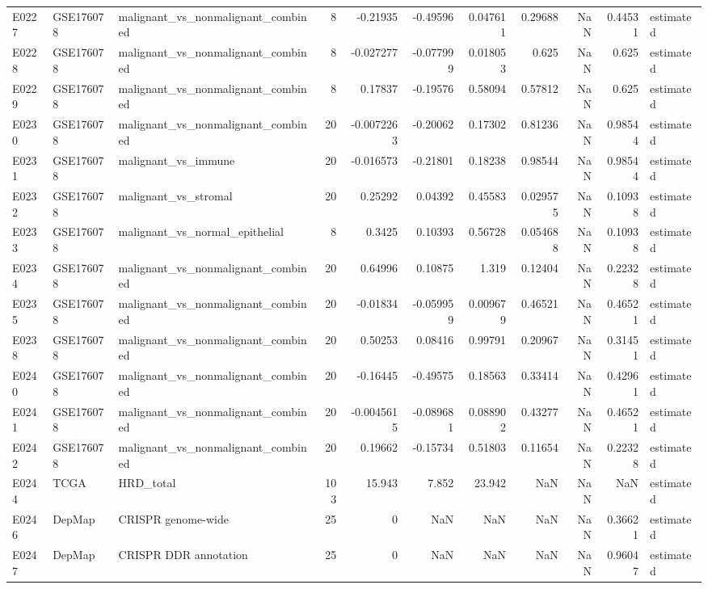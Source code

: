 \begin{longtable}{lllrrrrrrrl}
E0227 & GSE176078 & malignant\_vs\_nonmalignant\_combined & 8 & -0.21935 & -0.49596 & 0.047611 & 0.29688 & NaN & 0.44531 & estimated \\
E0228 & GSE176078 & malignant\_vs\_nonmalignant\_combined & 8 & -0.027277 & -0.077999 & 0.018053 & 0.625 & NaN & 0.625 & estimated \\
E0229 & GSE176078 & malignant\_vs\_nonmalignant\_combined & 8 & 0.17837 & -0.19576 & 0.58094 & 0.57812 & NaN & 0.625 & estimated \\
E0230 & GSE176078 & malignant\_vs\_nonmalignant\_combined & 20 & -0.0072263 & -0.20062 & 0.17302 & 0.81236 & NaN & 0.98544 & estimated \\
E0231 & GSE176078 & malignant\_vs\_immune & 20 & -0.016573 & -0.21801 & 0.18238 & 0.98544 & NaN & 0.98544 & estimated \\
E0232 & GSE176078 & malignant\_vs\_stromal & 20 & 0.25292 & 0.04392 & 0.45583 & 0.029575 & NaN & 0.10938 & estimated \\
E0233 & GSE176078 & malignant\_vs\_normal\_epithelial & 8 & 0.3425 & 0.10393 & 0.56728 & 0.054688 & NaN & 0.10938 & estimated \\
E0234 & GSE176078 & malignant\_vs\_nonmalignant\_combined & 20 & 0.64996 & 0.10875 & 1.319 & 0.12404 & NaN & 0.22328 & estimated \\
E0235 & GSE176078 & malignant\_vs\_nonmalignant\_combined & 20 & -0.01834 & -0.059959 & 0.009679 & 0.46521 & NaN & 0.46521 & estimated \\
E0238 & GSE176078 & malignant\_vs\_nonmalignant\_combined & 20 & 0.50253 & 0.08416 & 0.99791 & 0.20967 & NaN & 0.31451 & estimated \\
E0240 & GSE176078 & malignant\_vs\_nonmalignant\_combined & 20 & -0.16445 & -0.49575 & 0.18563 & 0.33414 & NaN & 0.42961 & estimated \\
E0241 & GSE176078 & malignant\_vs\_nonmalignant\_combined & 20 & -0.0045615 & -0.089681 & 0.088902 & 0.43277 & NaN & 0.46521 & estimated \\
E0242 & GSE176078 & malignant\_vs\_nonmalignant\_combined & 20 & 0.19662 & -0.15734 & 0.51803 & 0.11654 & NaN & 0.22328 & estimated \\
E0244 & TCGA & HRD\_total & 103 & 15.943 & 7.852 & 23.942 & NaN & NaN & NaN & estimated \\
E0246 & DepMap & CRISPR genome-wide & 25 & 0 & NaN & NaN & NaN & NaN & 0.36621 & estimated \\
E0247 & DepMap & CRISPR DDR annotation & 25 & 0 & NaN & NaN & NaN & NaN & 0.96047 & estimated \\
\end{longtable}
